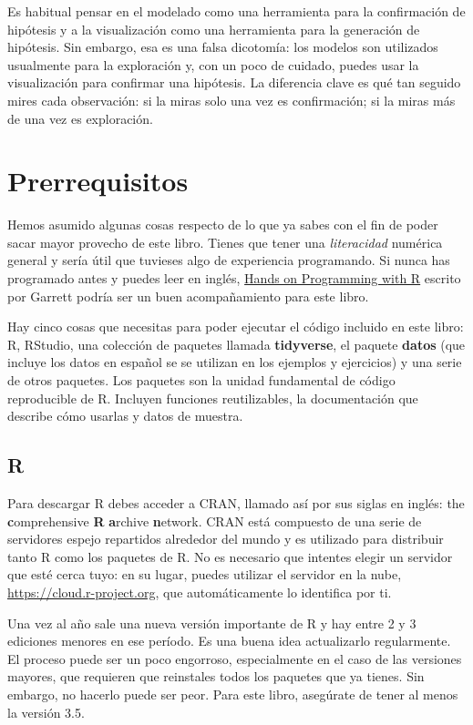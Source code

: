 \documentclass[11pt,oneside]{report}
\begin{document}
Es habitual pensar en el modelado como una herramienta para la
confirmación de hipótesis y a la visualización como una herramienta para
la generación de hipótesis. Sin embargo, esa es una falsa dicotomía: los
modelos son utilizados usualmente para la exploración y, con un poco de
cuidado, puedes usar la visualización para confirmar una hipótesis. La
diferencia clave es qué tan seguido mires cada observación: si la miras
solo una vez es confirmación; si la miras más de una vez es exploración.

\hypertarget{prerrequisitos}{%
\section{Prerrequisitos}\label{prerrequisitos}}

Hemos asumido algunas cosas respecto de lo que ya sabes con el fin de
poder sacar mayor provecho de este libro. Tienes que tener una
\emph{literacidad} numérica general y sería útil que tuvieses algo de
experiencia programando. Si nunca has programado antes y puedes leer en
inglés, \href{https://rstudio-education.github.io/hopr/}{Hands on
Programming with R} escrito por Garrett podría ser un buen
acompañamiento para este libro.

Hay cinco cosas que necesitas para poder ejecutar el código incluido en
este libro: R, RStudio, una colección de paquetes llamada
\textbf{tidyverse}, el paquete \textbf{datos} (que incluye los datos en
español se se utilizan en los ejemplos y ejercicios) y una serie de
otros paquetes. Los paquetes son la unidad fundamental de código
reproducible de R. Incluyen funciones reutilizables, la documentación
que describe cómo usarlas y datos de muestra.

\hypertarget{r}{%
\subsection{R}\label{r}}

Para descargar R debes acceder a CRAN, llamado así por sus siglas en
inglés: the \textbf{c}omprehensive \textbf{R} \textbf{a}rchive
\textbf{n}etwork. CRAN está compuesto de una serie de servidores espejo
repartidos alrededor del mundo y es utilizado para distribuir tanto R
como los paquetes de R. No es necesario que intentes elegir un servidor
que esté cerca tuyo: en su lugar, puedes utilizar el servidor en la
nube, \url{https://cloud.r-project.org}, que automáticamente lo
identifica por ti.

Una vez al año sale una nueva versión importante de R y hay entre 2 y 3
ediciones menores en ese período. Es una buena idea actualizarlo
regularmente. El proceso puede ser un poco engorroso, especialmente en
el caso de las versiones mayores, que requieren que reinstales todos los
paquetes que ya tienes. Sin embargo, no hacerlo puede ser peor. Para
este libro, asegúrate de tener al menos la versión 3.5.
\end{document}
